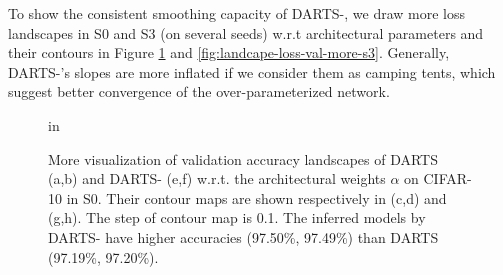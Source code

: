 \documentclass{article} \usepackage{iclr2021_conference,times}
\begin{document}
To show the consistent smoothing capacity of DARTS-, we draw more loss landscapes in S0 and S3 (on several seeds) w.r.t architectural parameters and their contours in Figure \ref{fig:landcape-loss-val-more-s0} and \ref{fig:landcape-loss-val-more-s3}.  Generally, DARTS-'s slopes are more inflated if we consider them as camping tents, which suggest better convergence of the over-parameterized network. 

\begin{figure}[ht]
	\centering
	 in
	\caption{More visualization of validation accuracy landscapes of  DARTS (a,b) and DARTS- (e,f) w.r.t. the architectural weights $\alpha$ on CIFAR-10 in S0. Their contour maps are shown respectively in (c,d) and (g,h). The step of contour map is 0.1. The inferred models by DARTS- have higher accuracies (97.50\%, 97.49\%) than DARTS (97.19\%, 97.20\%).}
	\label{fig:landcape-loss-val-more-s0}
\end{figure}
\end{document}
